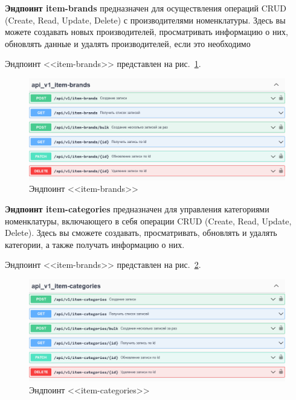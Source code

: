 \textbf{Эндпоинт item-brands} предназначен для осуществления операций CRUD (Create, Read, Update, Delete) с производителями номенклатуры.
Здесь вы можете создавать новых производителей, просматривать информацию о них, обновлять данные и удалять производителей, если это необходимо

Эндпоинт <<item-brands>> представлен на рис.~\ref{fig:swagger_item_brands}.

\begin{figure}[!p]
    \centering

    \includegraphics[width=12cm]
    {images/swagger/item-brands.png}

    \caption{Эндпоинт <<item-brands>>}

    \label{fig:swagger_item_brands}
\end{figure}

\textbf{Эндпоинт item-categories} предназначен для управления категориями номенклатуры,
включающего в себя операции CRUD (Create, Read, Update, Delete).
Здесь вы сможете создавать, просматривать, обновлять и удалять категории, а также получать информацию о них.

Эндпоинт <<item-brands>> представлен на рис.~\ref{fig:swagger_item_categories}.

\begin{figure}[!p]
    \centering

    \includegraphics[width=12cm]
    {images/swagger/item-categories.png}

    \caption{Эндпоинт <<item-categories>>}

    \label{fig:swagger_item_categories}
\end{figure}

